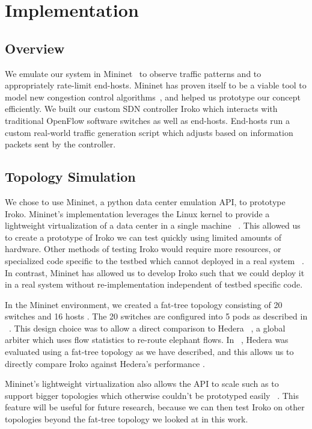 

\section{Implementation}
\subsection{Overview}

We emulate our system in Mininet~\cite{mininet} to observe traffic 
patterns and to appropriately rate-limit end-hosts. Mininet has proven itself to be 
a viable tool to model new congestion control 
algorithms~\cite{mininet_learning}, and helped us prototype our concept 
efficiently. We built our custom SDN controller Iroko which interacts with 
traditional OpenFlow software switches as well as end-hosts. End-hosts run 
a custom real-world traffic generation script which adjusts based on 
information packets sent by the controller.


\subsection{Topology Simulation}
We chose to use  Mininet, a python data center emulation API, to prototype Iroko. Mininet's implementation leverages the Linux kernel to provide a lightweight virtualization of a data center in a single machine ~\cite{mininet}. This allowed us to create a prototype of Iroko we can test quickly using limited amounts of hardware. Other methods of testing Iroko would require more resources, or specialized code specific to the testbed which cannot deployed in a real system ~\cite{mininet}. In contrast, Mininet has allowed us to develop Iroko such that we could deploy it in a real system without re-implementation independent of testbed specific code. 

In the Mininet environment, we created a fat-tree topology consisting of 20 switches and 16 hosts . The 20 switches are configured into 5 pods as described in ~\cite{fattree}. This design choice was to allow a direct comparison to Hedera  ~\cite{hedera}, a global arbiter which uses flow statistics to re-route elephant flows. In ~\cite{hedera}, Hedera was evaluated  using a fat-tree topology as we have described, and this allows us to directly compare Iroko against Hedera's performance . 

Mininet’s lightweight virtualization also allows the API to scale such as to support bigger topologies which otherwise couldn’t be prototyped easily ~\cite{mininet}. This feature will be useful for future research, because we can then test Iroko on other topologies beyond the fat-tree topology we looked at in this work. 

